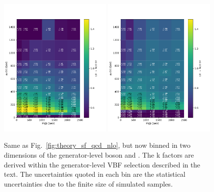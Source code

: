 \begin{figure}[ht!]
    \begin{center}
        \includegraphics[width=0.49\textwidth]{fig/theory/2d_dy_gen_vpt_vbf_dress.pdf}
        \includegraphics[width=0.49\textwidth]{fig/theory/2d_wjet_gen_vpt_vbf_dress.pdf} \\
        \caption{
            Same as Fig.~\ref{fig:theory_sf_qcd_nlo}, but now binned in two dimensions of the generator-level boson \pt and \mjj.
            The k factors are derived within the generator-level VBF selection described in the text.
            The uncertainties quoted in each bin are the statistical uncertainties due to the finite size of simulated samples.
          }
      \label{fig:theory_sf_qcd_nlo_2d_wz}
    \end{center}
  \end{figure}

